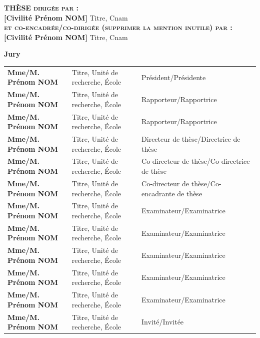 \begin{minipage}{\textwidth}
\begin{center}
\textbf{\textsc{\large TH\`{E}SE dirig\'{e}e par :}} \\
\vspace{0.1cm}
{\large \textbf{[Civilité Prénom NOM]}} {\large{Titre, Cnam}} \\
\vspace{0.5cm}
\textbf{\textsc{\large et co-encadrée/co-dirigée (supprimer la mention inutile) par :}} \\
{\large \textbf{[Civilité Prénom NOM]}} {\large{Titre, Cnam}} \\

\end{center}
\end{minipage}

\vspace{0.7cm}

\noindent 
\begin{minipage}{\textwidth}
\textbf{Jury} \\
   \begin{tabular}{p{5cm} p{5.5cm} l}
	 \textbf{Mme/M. Prénom NOM} & Titre, Unité de recherche, \'Ecole &  Président/Présidente  \\
	 \textbf{Mme/M. Prénom NOM} & Titre, Unité de recherche, \'Ecole &  Rapporteur/Rapportrice  \\
	 \textbf{Mme/M. Prénom NOM} & Titre, Unité de recherche, \'Ecole &  Rapporteur/Rapportrice  \\
	 \textbf{Mme/M. Prénom NOM} & Titre, Unité de recherche, \'Ecole &  Directeur de thèse/Directrice de thèse  \\
	 \textbf{Mme/M. Prénom NOM} & Titre, Unité de recherche, \'Ecole &  Co-directeur de thèse/Co-directrice de thèse\\
	 \textbf{Mme/M. Prénom NOM} & Titre, Unité de recherche, \'Ecole &  Co-directeur de thèse/Co-encadrante de thèse  \\
 	 \textbf{Mme/M. Prénom NOM} & Titre, Unité de recherche, \'Ecole & Examinateur/Examinatrice\\
     \textbf{Mme/M. Prénom NOM} & Titre, Unité de recherche, \'Ecole & Examinateur/Examinatrice\\
	 \textbf{Mme/M. Prénom NOM} & Titre, Unité de recherche, \'Ecole & Examinateur/Examinatrice \\
	 \textbf{Mme/M. Prénom NOM} & Titre, Unité de recherche, \'Ecole & Examinateur/Examinatrice \\
     \textbf{Mme/M. Prénom NOM} & Titre, Unité de recherche, \'Ecole & Examinateur/Examinatrice \\
     \textbf{Mme/M. Prénom NOM} & Titre, Unité de recherche, \'Ecole & Invité/Invitée
\end{tabular}  
\end{minipage}